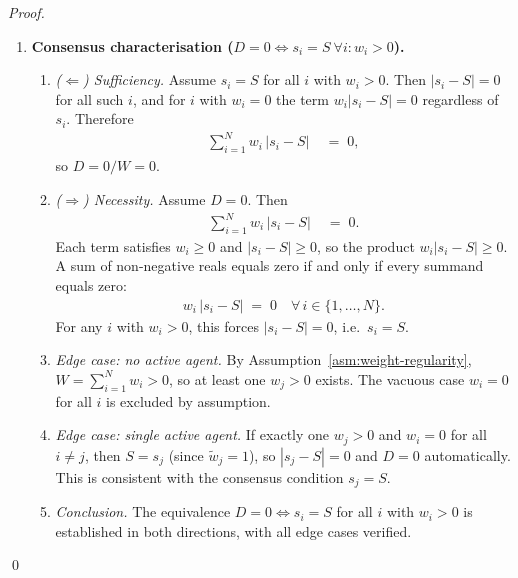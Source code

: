 \documentclass[12pt,openany]{book}
\numberwithin{equation}{chapter}
\theoremstyle{plain}
\theoremstyle{definition}
\theoremstyle{remark}
\numberwithin{equation}{chapter}
\theoremstyle{plain}
\begin{document}
\begin{proof}
\begin{enumerate}
  \item \textbf{Consensus characterisation ($D = 0 \Leftrightarrow
        s_i = S\ \forall i : w_i > 0$).}

  \begin{enumerate}
    \item \emph{($\Leftarrow$) Sufficiency.}
          Assume $s_i = S$ for all $i$ with $w_i > 0$.
          Then $|s_i - S| = 0$ for all such $i$, and
          for $i$ with $w_i = 0$ the term $w_i |s_i - S| = 0$
          regardless of $s_i$.  Therefore
          \begin{align}
            \sum_{i=1}^{N} w_i\,\bigl|s_i - S\bigr|
            &\;=\; 0,
          \end{align}
          so $D = 0/W = 0$.

    \item \emph{($\Rightarrow$) Necessity.}
          Assume $D = 0$.  Then
          \begin{align}
            \sum_{i=1}^{N} w_i\,\bigl|s_i - S\bigr|
            &\;=\; 0.
          \end{align}
          Each term satisfies $w_i \geq 0$ and
          $|s_i - S| \geq 0$, so the product
          $w_i |s_i - S| \geq 0$.
          A sum of non-negative reals equals zero if and only
          if every summand equals zero:
          \begin{align}
            w_i\,\bigl|s_i - S\bigr| \;=\; 0
            \quad \forall\, i \in \{1,\ldots,N\}.
          \end{align}
          For any $i$ with $w_i > 0$, this forces
          $|s_i - S| = 0$, i.e.\ $s_i = S$.

    \item \emph{Edge case: no active agent.}
          By Assumption~\ref{asm:weight-regularity},
          $W = \sum_{i=1}^{N} w_i > 0$, so at least one
          $w_j > 0$ exists.  The vacuous case $w_i = 0$
          for all $i$ is excluded by assumption.

    \item \emph{Edge case: single active agent.}
          If exactly one $w_j > 0$ and $w_i = 0$ for all
          $i \neq j$, then $S = s_j$ (since
          $\tilde{w}_j = 1$), so $|s_j - S| = 0$ and
          $D = 0$ automatically.  This is consistent with
          the consensus condition $s_j = S$.

    \item \emph{Conclusion.}
          The equivalence $D = 0 \Leftrightarrow s_i = S$
          for all $i$ with $w_i > 0$ is established in
          both directions, with all edge cases verified.
  \end{enumerate}

\end{enumerate}
\qed
\end{proof}
\end{document}
